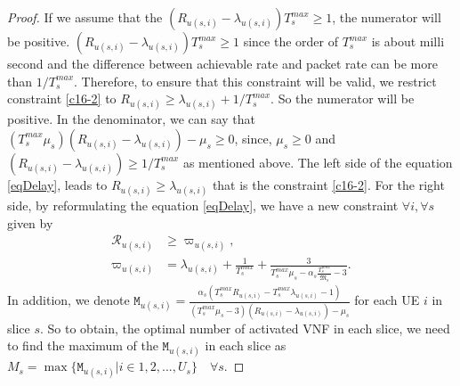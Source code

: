 \documentclass[lettersize,journal]{IEEEtran}
\begin{document}
\begin{proof}
If we assume that the $(R_{u(s,i)}-\lambda_{u(s,i)})T^{max}_s \geq 1$, the numerator will be positive.
$(R_{u(s,i)}-\lambda_{u(s,i)})T^{max}_s \geq 1$ since the order of $T^{max}_s$ is about milli second and the difference between achievable rate and packet rate can be more than $1/T^{max}_s$.
Therefore, to ensure that this constraint will be valid, we restrict constraint \eqref{c16-2} to $R_{u(s,i)} \geq \lambda_{u(s,i)} + 1/T^{max}_s$.
So the numerator will be positive.
In the denominator, we can say that $(T^{max}_s\mu_s)(R_{u(s,i)}-\lambda_{u(s,i)}) - \mu_s \geq 0 $, since,
$\mu_s \geq 0$ and
$(R_{u(s,i)}-\lambda_{u(s,i)}) \geq 1/T^{max}_s$ as mentioned above.
The left side of the equation \eqref{eqDelay}, leads to $R_{u(s,i)} \geq \lambda_{u(s,i)}$ that is the constraint \eqref{c16-2}.
For the right side, by reformulating the equation \eqref{eqDelay}, we have a new constraint $\forall i, \forall s$ given by
\begin{align}\label{RM}
\mathcal{R}_{u(s,i)} &\geq \varpi_{u(s,i)}, \\
\varpi_{u(s,i)} &= \lambda_{u(s,i)} + \frac{1}{T^{max}_s}+ \frac{3}{T^{max}_s\mu_s-\alpha_s \frac{T^{max}_s}{\mathfrak{M}_s}-3}.
\end{align}
In addition, we denote $\mathtt{M}_{u(s,i)} = \frac{\alpha_s(T^{max}_s R_{u(s,i)}-T^{max}_s\lambda_{u(s,i)} -1)}{(T^{max}_s\mu_s-3)(R_{u(s,i)}-\lambda_{u(s,i)}) - \mu_s }$ for each UE $i$ in slice $s$.
So to obtain, the optimal number of activated VNF in each slice, we need to find the maximum of the
$\mathtt{M}_{u(s,i)}$ in each slice as $M_s = \max\{\mathtt{M}_{u(s,i)} | i \in 1,2,..., U_s\} \quad \forall s $.
\end{proof}
\end{document}
